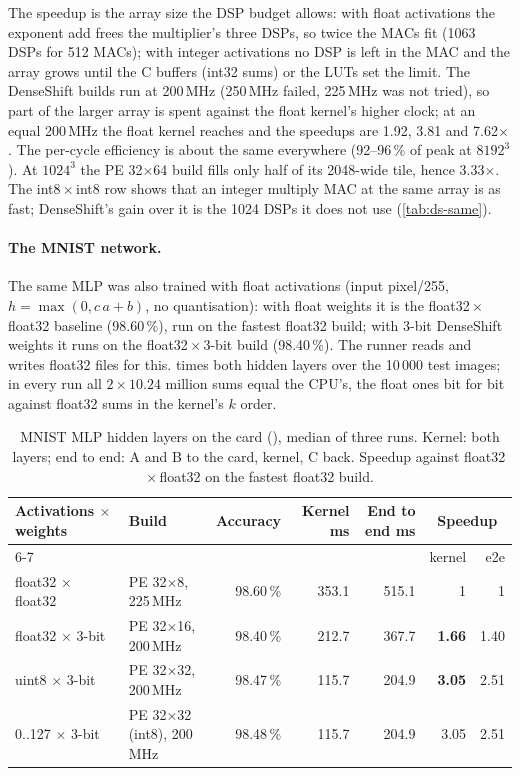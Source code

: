 The speedup is the array size the DSP budget allows: with float activations the exponent add frees the multiplier's
three DSPs, so twice the MACs fit (1063 DSPs for 512 MACs); with integer activations no DSP is left in the MAC and
the array grows until the C buffers (int32 sums) or the LUTs set the limit. The DenseShift builds run at 200\,MHz
(250\,MHz failed, 225\,MHz was not tried), so part of the larger array is spent against the float kernel's higher
clock; at an equal 200\,MHz the float kernel reaches  and the speedups are 1.92, 3.81 and
7.62\(\times\). The per-cycle efficiency is about the same everywhere (92--96\,\% of peak at \(8192^3\)). At
\(1024^3\) the PE 32\(\times\)64 build fills only half of its 2048-wide tile, hence 3.33\(\times\). The
int8\,\(\times\)\,int8 row shows that an integer multiply MAC at the same array is as fast; DenseShift's gain over it
is the 1024 DSPs it does not use (\cref{tab:ds-same}).

\paragraph{The MNIST network.} The same MLP was also trained with float activations (input pixel/255,
\(h = \max(0, c\,a + b)\), no quantisation): with float weights it is the float32\,\(\times\)\,float32 baseline
(98.60\,\%), run on the fastest float32 build; with 3-bit DenseShift weights it runs on the float32\,\(\times\)\,3-bit
build (98.40\,\%). The runner reads and writes float32 files for this.  times both hidden layers
over the 10\,000 test images; in every run all \(2\times10.24\) million sums equal the CPU's, the float ones bit for
bit against float32 sums in the kernel's \(k\) order.

\begin{table}[ht]
\centering\small\setlength{\tabcolsep}{4pt}
\caption{MNIST MLP hidden layers on the card (), median of three runs.
  Kernel: both layers; end to end: A and B to the card, kernel, C back. Speedup against float32\,\(\times\)\,float32
  on the fastest float32 build.}
\label{tab:ds-mnist}
\begin{tabular}{@{}llrrrrr@{}}
\toprule
Activations \(\times\) weights & Build & Accuracy & Kernel ms & End to end ms & \multicolumn{2}{c}{Speedup} \\
\cmidrule(lr){6-7}
& & & & & kernel & e2e \\
\midrule
float32 \(\times\) float32 & PE 32\(\times\)8, 225\,MHz & 98.60\,\% & 353.1 & 515.1 & 1 & 1 \\
float32 \(\times\) 3-bit & PE 32\(\times\)16, 200\,MHz & 98.40\,\% & 212.7 & 367.7 & \textbf{1.66} & 1.40 \\
uint8 \(\times\) 3-bit & PE 32\(\times\)32, 200\,MHz & 98.47\,\% & 115.7 & 204.9 & \textbf{3.05} & 2.51 \\
0..127 \(\times\) 3-bit & PE 32\(\times\)32 (int8), 200\,MHz & 98.48\,\% & 115.7 & 204.9 & 3.05 & 2.51 \\
\bottomrule
\end{tabular}
\end{table}

